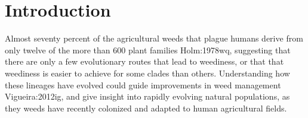 \documentclass[twocolumn]{bmcart}%
\begin{document}

\linenumbers



\section*{Introduction}
Almost seventy percent of the agricultural weeds that plague humans derive from only twelve of the more than 600 plant families {Holm:1978wq}, suggesting that there are only a few evolutionary routes that lead to weediness, or that that weediness is easier to achieve for some clades than others. Understanding how these lineages have evolved could guide improvements in weed management {Vigueira:2012ig}, and give insight into rapidly evolving natural populations, as they weeds have recently colonized and adapted to human agricultural fields. 
\end{document}
